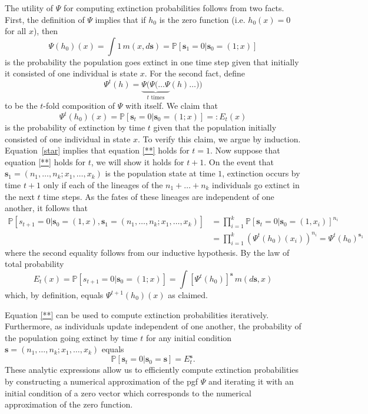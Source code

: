 \documentclass[12pt]{amsart}\usepackage[]{graphicx}\usepackage[]{color}
\def\P{\mathbb P}
\def\s{\mathbf s}
\begin{document}
The utility of $\Psi$ for computing extinction probabilities follows from two facts. First, the definition of $\Psi$ implies that if $h_0$ is the zero function (i.e. $h_0(x)=0$ for all $x$), then
\begin{equation}\label{star}
\Psi(h_0)(x)=\int 1 \,m(x,d\s)= \P[\s_1=0|\s_0=(1;x)]
\end{equation}
is the probability the population goes extinct in one time step given that initially it consisted of one individual is state $x$. For the second fact, define
\[
\Psi^t(h)=\underbrace{\Psi(\Psi(\dots \Psi}_{\mbox{$t$ times}}(h)\dots))
\]
to be the $t$-fold composition of $\Psi$ with itself. We claim that
\begin{equation}\label{**}
\Psi^t(h_0)(x)=\P[\s_t=0|\s_0=(1;x)]=:E_t(x)
\end{equation}
is the probability of extinction by time $t$ given that the population initially consisted of one individual in state $x$. To verify this claim, we argue by induction. Equation~\ref{star} implies that equation \eqref{**} holds for $t=1$. Now suppose that equation \eqref{**} holds for $t$, we will show it holds for $t+1$.  On the event that $\s_1=(n_1,\dots,n_k;x_1,\dots,x_k)$ is the population state at time $1$, extinction occurs by time $t+1$ only if each of the lineages of the $n_1+\dots +n_k$ individuals go extinct in the next $t$ time steps. As the fates of these lineages are independent of one another, it follows that
\[
\begin{aligned}
\P[s_{t+1}=0|\s_0=(1,x),\s_1=(n_1,\dots,n_k;x_1,\dots,x_k)]&= \prod_{i=1}^k \P[\s_t=0|\s_0=(1,x_i)]^{n_i}\\
&=\prod_{i=1}^k\left(\Psi^t(h_0)(x_i)\right)^{n_i}=\Psi^t(h_0)^{\s_1}
\end{aligned}
\]
where the second equality follows from our inductive hypothesis. By the law of total probability
\[
E_t(x)=\P[s_{t+1}=0|\s_0=(1;x)]=\int [\Psi^t(h_0)]^\s \,m(d\s,x)
\]
which, by definition, equals $\Psi^{t+1}(h_0)(x)$ as claimed.

Equation \eqref{**} can be used to compute extinction probabilities iteratively. Furthermore, as individuals update independent of one another, the probability of the population going extinct by time $t$ for any initial condition $\s=(n_1,\dots,n_k;x_1,\dots,x_k)$ equals
\begin{equation}\label{starstar}
\P[\s_t=0|\s_0=\s]=E_t^\s.
\end{equation}
These analytic expressions allow us to efficiently compute extinction probabilities by constructing a numerical approximation of the pgf $\Psi$ and iterating it with an initial condition of a zero vector which corresponds to the numerical approximation of the zero function.
\end{document}
